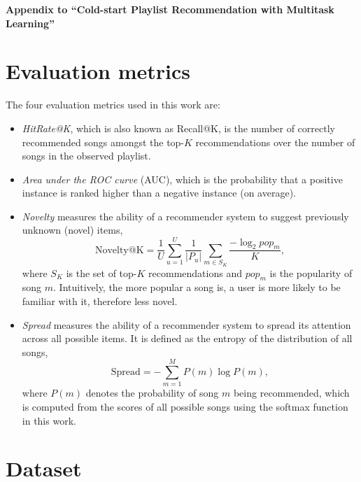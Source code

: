 \appendix
\begin{center}
  {\Large\bf Appendix to ``Cold-start Playlist Recommendation with Multitask Learning''}
\end{center}
\rule{0pt}{50pt}





\clearpage
\newpage

\section{Evaluation metrics}
The four evaluation metrics used in this work are:
\begin{itemize}
\item \emph{HitRate@K}, which is also known as Recall@K, is the number of correctly recommended songs amongst the top-$K$ recommendations over
      the number of songs in the observed playlist.
\item \emph{Area under the ROC curve} (AUC), which is the probability that a positive instance is ranked higher than a negative instance (on average).
\item \emph{Novelty} measures the ability of a recommender system to suggest previously unknown (\ie novel) items,
      $$
      \text{Novelty@K} = \frac{1}{U} \sum_{u=1}^U \frac{1}{|P_u|} \sum_{m \in S_K} \frac{-\log_2 pop_m}{K},
      $$
      where $S_K$ is the set of top-$K$ recommendations and $pop_m$ is the popularity of song $m$.
      Intuitively, the more popular a song is, a user is more likely to be familiar with it, therefore less novel.
\item \emph{Spread} measures the ability of a recommender system to spread its attention across all possible items.
      It is defined as the entropy of the distribution of all songs,
      $$
      \text{Spread} = -\sum_{m=1}^M P(m) \log P(m),
      $$
      where $P(m)$ denotes the probability of song $m$ being recommended,
      which is computed from the scores of all possible songs using the softmax function in this work.
\end{itemize}


\clearpage
\newpage

\section{Dataset}


